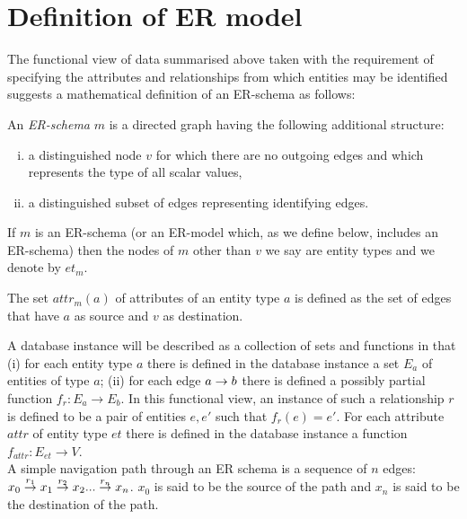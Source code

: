 \documentclass[10pt,a4paper]{article}
\newcommand{\commentary}[1]{\marginpar{\footnotesize #1}}
\newcommand{\genericmodel}{\mathcal{M}}
\renewcommand{\genericmodel}{{m}}
\newcommand{\veee}{v}
\newcommand{\Veee}{V}
\newcommand{\et}[1][\genericmodel]{et_{#1}}
\newcommand{\attr}[2] [\genericmodel]{attr_{#1}(#2)}
\newcommand{\term}[1]{\textit{{#1}}}
\begin{document}
\section{Definition of ER model}
The functional view of data summarised above\commentary{No it isn't.} taken with the requirement of specifying the attributes and relationships from which entities may be identified suggests a mathematical definition of an ER-schema  as  follows:

\begin{definition}
An \term{ER-schema} $\genericmodel$ is a directed graph having the following additional structure:

\begin{enumerate} [(i)]
\item{a distinguished node $\veee$ for which there are no outgoing edges and which represents the type of all scalar values, }

\item{a distinguished subset of edges representing identifying edges.
}
\end{enumerate}

\end{definition}

If $\genericmodel$ is an ER-schema (or an ER-model which, as we define below, 
includes an ER-schema) then the nodes of $\genericmodel$ other than $\veee$ we say are entity types and we denote by $\et$.

The set $\attr{a}$ of attributes of an entity type $a$ is defined as the set of edges that have $a$ as source and  $\veee$ as destination. 

A database instance will be described as a collection of sets 
and functions in that (i) for each entity type $a$ there is defined in 
the database instance a set $E_a$ of entities of type $a$;
(ii) for each edge $a \rightarrow b$
there is defined a possibly partial function $f_r : E_a \rightarrow E_b$. 
In this functional view, an instance of such a relationship $r$ is defined to be a pair 
of entities $e,e'$ such that $f_r(e)=e'$. For each attribute $attr$
of entity type $et$ there is defined in the database instance a function
$f_{attr}: E_{et} \rightarrow \Veee$. \\

\noindent A simple navigation path through an ER schema  is a
sequence of  $n$ edges:
$\overset{r_1}{x_0 \rightarrow   x_1} \overset{r_2}{\rightarrow} x_2 ... \overset{r_n}{\rightarrow} x_n$.  $x_0$ is said to be the source of the path and $x_n$ is said to be the destination of the path. 
\end{document}
